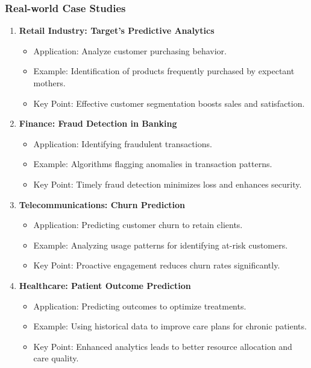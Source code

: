 \documentclass{beamer}
\begin{document}
\begin{frame}[fragile]
    \frametitle{Real-world Case Studies}
    \begin{enumerate}
        \item \textbf{Retail Industry: Target’s Predictive Analytics}
        \begin{itemize}
            \item Application: Analyze customer purchasing behavior.
            \item Example: Identification of products frequently purchased by expectant mothers.
            \item Key Point: Effective customer segmentation boosts sales and satisfaction.
        \end{itemize}

        \item \textbf{Finance: Fraud Detection in Banking}
        \begin{itemize}
            \item Application: Identifying fraudulent transactions.
            \item Example: Algorithms flagging anomalies in transaction patterns.
            \item Key Point: Timely fraud detection minimizes loss and enhances security.
        \end{itemize}

        \item \textbf{Telecommunications: Churn Prediction}
        \begin{itemize}
            \item Application: Predicting customer churn to retain clients.
            \item Example: Analyzing usage patterns for identifying at-risk customers.
            \item Key Point: Proactive engagement reduces churn rates significantly.
        \end{itemize}

        \item \textbf{Healthcare: Patient Outcome Prediction}
        \begin{itemize}
            \item Application: Predicting outcomes to optimize treatments.
            \item Example: Using historical data to improve care plans for chronic patients.
            \item Key Point: Enhanced analytics leads to better resource allocation and care quality.
        \end{itemize}
    \end{enumerate}
\end{frame}
\end{document}
